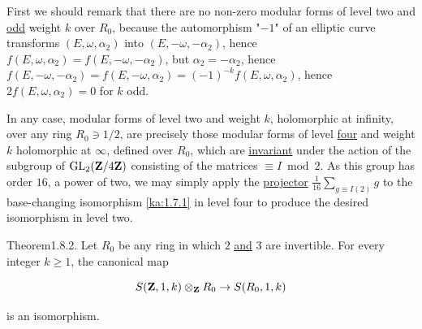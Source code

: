 \begin{kaproof}
First we should remark that there are no non-zero modular forms of level two and
\uline{odd} weight $k$ over $R_0$, because the automorphism "$-1$" of an
elliptic curve transforms $(E,\omega,\alpha_2)$ into $(E,-\omega,-\alpha_2)$,
hence $f(E,\omega,\alpha_2) = f(E,-\omega,-\alpha_2)$, but $\alpha_2 = -\alpha_2$,
hence $f(E,-\omega,-\alpha_2) = f(E,-\omega,\alpha_2) = (-1)^{-k}f(E,\omega,\alpha_2)$,
hence $2f(E,\omega,\alpha_2) = 0$ for $k$ odd.

In any case, modular forms of level two and weight $k$, holomorphic at
infinity, over any ring $R_0\ni 1/2$, are precisely those modular forms of
level \uline{four} and weight $k$ holomorphic at $\infty$, defined over $R_0$,
which are \uline{invariant} under the action of the subgroup of
$\operatorname{GL}_2(\mathbf{Z}/4\mathbf{Z})$ consisting of the matrices $\equiv I\bmod 2$. As this group has
order $16$, a power of two, we may simply apply the \uline{projector}
$\frac{1}{16}\sum_{g\equiv I(2)}g$ to the base-changing isomorphism \eqref{ka:1.7.1} in
level four to produce the desired isomorphism in level two.
\end{kaproof}

\begin{kathm}{Theorem}{1.8.2.}
Let $R_0$ be any ring in which $2$ \uline{and} $3$ are invertible. For every
integer $k\geq 1$, the canonical map

\[
S(\mathbf{Z},1,k)\otimes_{\mathbf{Z}} R_0\to S(R_0,1,k)
\]

is an isomorphism.
\end{kathm}

